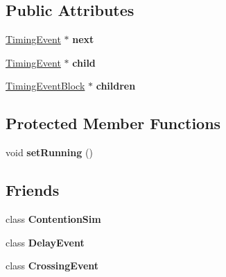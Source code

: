 \subsection*{Public Attributes}
\begin{DoxyCompactItemize}
\item 
\hypertarget{classTimingEvent_a019a971b0d26828112a9d46c9f13c88d}{\hyperlink{classTimingEvent}{Timing\-Event} $\ast$ {\bfseries next}}\label{classTimingEvent_a019a971b0d26828112a9d46c9f13c88d}

\item 
\hypertarget{classTimingEvent_ae9bb9c89858f97ec7aacfa371cca7edd}{\hyperlink{classTimingEvent}{Timing\-Event} $\ast$ {\bfseries child}}\label{classTimingEvent_ae9bb9c89858f97ec7aacfa371cca7edd}

\item 
\hypertarget{classTimingEvent_a98c9209a0010bea8ed7d5e3e0b46c718}{\hyperlink{structTimingEventBlock}{Timing\-Event\-Block} $\ast$ {\bfseries children}}\label{classTimingEvent_a98c9209a0010bea8ed7d5e3e0b46c718}

\end{DoxyCompactItemize}
\subsection*{Protected Member Functions}
\begin{DoxyCompactItemize}
\item 
\hypertarget{classTimingEvent_a7051fb745d607c888e614459857f355a}{void {\bfseries set\-Running} ()}\label{classTimingEvent_a7051fb745d607c888e614459857f355a}

\end{DoxyCompactItemize}
\subsection*{Friends}
\begin{DoxyCompactItemize}
\item 
\hypertarget{classTimingEvent_a96b81ec5d9f4b197024c5bd08fc10c38}{class {\bfseries Contention\-Sim}}\label{classTimingEvent_a96b81ec5d9f4b197024c5bd08fc10c38}

\item 
\hypertarget{classTimingEvent_a04ce3d094c04be49d02f3a13abd8bc81}{class {\bfseries Delay\-Event}}\label{classTimingEvent_a04ce3d094c04be49d02f3a13abd8bc81}

\item 
\hypertarget{classTimingEvent_a39c74d540b8bf3b5362d5e209404b01f}{class {\bfseries Crossing\-Event}}\label{classTimingEvent_a39c74d540b8bf3b5362d5e209404b01f}

\end{DoxyCompactItemize}


